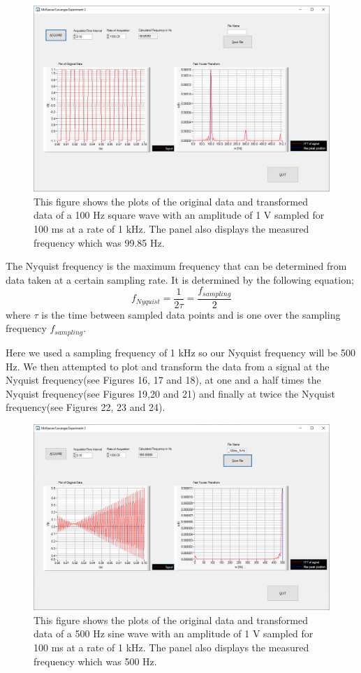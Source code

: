 \documentclass{article}
\begin{document}
\begin{figure}[H]
\includegraphics[scale=0.4,center]{Square100ms.png}
\caption{This figure shows the plots of the original data and transformed data of a 100 Hz square wave with an amplitude of 1 V sampled for 100 ms at a rate of 1 kHz.  The panel also displays the measured frequency which was 99.85 Hz.}
\end{figure}

The Nyquist frequency is the maximum frequency that can be determined from data taken at a certain sampling rate.  It is determined by the following equation;
$$f_{Nyquist}=\frac{1}{2\tau}=\frac{f_{sampling}}{2}$$ where $\tau$ is the time between sampled data points and is one over the sampling frequency $f_{sampling}$.

Here we used a sampling frequency of 1 kHz so our Nyquist frequency will be 500 Hz.  We then attempted to plot and transform the data from a signal at the Nyquist frequency(see Figures 16, 17 and 18), at one and a half times the Nyquist frequency(see Figures 19,20 and 21) and finally at twice the Nyquist frequency(see Figures 22, 23 and 24).

\begin{figure}[H]
\includegraphics[scale=0.4,center]{Nyquist.png}
\caption{This figure shows the plots of the original data and transformed data of a 500 Hz sine wave with an amplitude of 1 V sampled for 100 ms at a rate of 1 kHz.  The panel also displays the measured frequency which was 500 Hz.}
\end{figure}
\end{document}
